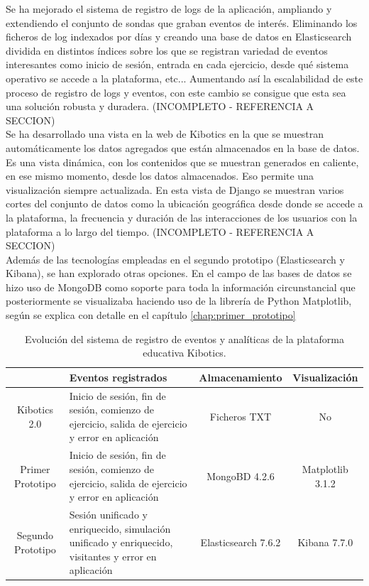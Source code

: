 \documentclass[a4paper, 12pt]{book}
\begin{document}
		Se ha mejorado el sistema de registro de logs de la aplicación, ampliando y extendiendo el conjunto de sondas que graban eventos de interés. Eliminando los ficheros de log indexados por días y creando una base de datos en Elasticsearch dividida en distintos índices sobre los que se registran variedad de eventos interesantes como inicio de sesión, entrada en cada ejercicio, desde qué sistema operativo se accede a la plataforma, etc... Aumentando así la escalabilidad de este proceso de registro de logs y eventos, con este cambio se consigue que esta sea una solución robusta y duradera. (INCOMPLETO - REFERENCIA A SECCION)\\
	
		Se ha desarrollado una vista en la web de Kibotics en la que se muestran automáticamente los datos agregados que están almacenados en la base de datos. Es una vista dinámica, con los contenidos que se muestran generados en caliente, en ese mismo momento, desde los datos almacenados. Eso permite una visualización siempre actualizada. En esta vista de Django se muestran varios cortes del conjunto de datos como la ubicación geográfica desde donde se accede a la plataforma, la frecuencia y duración de las interacciones de los usuarios con la plataforma a lo largo del tiempo. (INCOMPLETO - REFERENCIA A SECCION)\\
	
		Además de las tecnologías empleadas en el segundo prototipo (Elasticsearch y Kibana), se han explorado otras opciones. En el campo de las bases de datos se hizo uso de MongoDB como soporte para toda la información circunstancial que posteriormente se visualizaba haciendo uso de la librería de Python Matplotlib, según se explica con detalle en el capítulo \ref{chap:primer_prototipo} \\

		
		\begin{table}[H]
			\begin{center}
				\begin{tabular}{ | c | p{6cm} | c | c |} 
					\hline
				 & Eventos registrados & Almacenamiento & Visualización \\ 
					\hline 
					Kibotics 2.0 & Inicio de sesión, fin de sesión, comienzo de ejercicio, salida de ejercicio y error en aplicación & Ficheros TXT & No\\ 
					\hline
					Primer Prototipo & Inicio de sesión, fin de sesión, comienzo de ejercicio, salida de ejercicio y error en aplicación& MongoBD 4.2.6 & Matplotlib 3.1.2\\ 
					\hline
					Segundo Prototipo & Sesión unificado y enriquecido, simulación  unificado y enriquecido, visitantes y error en aplicación & Elasticsearch 7.6.2 & Kibana 7.7.0\\ 
					\hline

				\end{tabular}
				\label{tabla:evolucion_analiticas}
				\caption{Evolución del sistema de registro de eventos y analíticas de la plataforma educativa Kibotics.}
			\end{center}
		\end{table}
	
\end{document}
